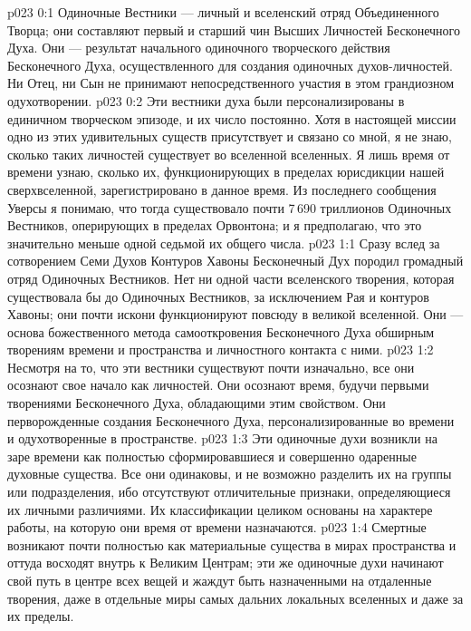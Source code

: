 \author{Божественный Советник}
\vs p023 0:1 Одиночные Вестники --- личный и вселенский отряд Объединенного Творца; они составляют первый и старший чин Высших Личностей Бесконечного Духа. Они --- результат начального одиночного творческого действия Бесконечного Духа, осуществленного для создания одиночных духов\hyp{}личностей. Ни Отец, ни Сын не принимают непосредственного участия в этом грандиозном одухотворении.
\vs p023 0:2 Эти вестники духа были персонализированы в единичном творческом эпизоде, и их число постоянно. Хотя в настоящей миссии одно из этих удивительных существ присутствует и связано со мной, я не знаю, сколько таких личностей существует во вселенной вселенных. Я лишь время от времени узнаю, сколько их, функционирующих в пределах юрисдикции нашей сверхвселенной, зарегистрировано в данное время. Из последнего сообщения Уверсы я понимаю, что тогда существовало почти 7\,690 триллионов Одиночных Вестников, оперирующих в пределах Орвонтона; и я предполагаю, что это значительно меньше одной седьмой их общего числа.
\vs p023 1:1 Сразу вслед за сотворением Семи Духов Контуров Хавоны Бесконечный Дух породил громадный отряд Одиночных Вестников. Нет ни одной части вселенского творения, которая существовала бы до Одиночных Вестников, за исключением Рая и контуров Хавоны; они почти искони функционируют повсюду в великой вселенной. Они --- основа божественного метода самооткровения Бесконечного Духа обширным творениям времени и пространства и личностного контакта с ними.
\vs p023 1:2 Несмотря на то, что эти вестники существуют почти изначально, все они осознают свое начало как личностей. Они осознают время, будучи первыми творениями Бесконечного Духа, обладающими этим свойством. Они перворожденные создания Бесконечного Духа, персонализированные во времени и одухотворенные в пространстве.
\vs p023 1:3 Эти одиночные духи возникли на заре времени как полностью сформировавшиеся и совершенно одаренные духовные существа. Все они одинаковы, и не возможно разделить их на группы или подразделения, ибо отсутствуют отличительные признаки, определяющиеся их личными различиями. Их классификации целиком основаны на характере работы, на которую они время от времени назначаются.
\vs p023 1:4 Смертные возникают почти полностью как материальные существа в мирах пространства и оттуда восходят внутрь к Великим Центрам; эти же одиночные духи начинают свой путь в центре всех вещей и жаждут быть назначенными на отдаленные творения, даже в отдельные миры самых дальних локальных вселенных и даже за их пределы.
